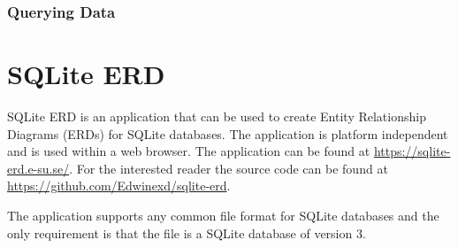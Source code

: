 \documentclass[a4paper,10pt,oneside]{article}
\begin{document}
\subsubsection{Querying Data}
\label{sqliteStudioQueryingData}

\section{SQLite ERD}
\label{sqliteERD}
SQLite ERD is an application that can be used to create Entity Relationship Diagrams (ERDs) for SQLite databases. The application is platform independent and is used within a web browser. The application can be found at \url{https://sqlite-erd.e-su.se/}. For the interested reader the source code can be found at \url{https://github.com/Edwinexd/sqlite-erd}.

The application supports any common file format for SQLite databases and the only requirement is that the file is a SQLite database of version 3.



\end{document}
